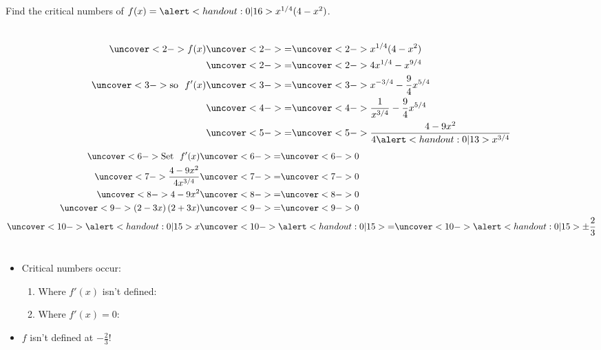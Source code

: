 \begin{frame}
\begin{example}
Find the critical numbers of $f(x) = \alert<handout:0| 16>{x^{1/4}}(4-x^2)$.
\begin{columns}[c]
\abovedisplayskip=0pt
\belowdisplayskip=0pt
\abovedisplayshortskip=0pt
\belowdisplayshortskip=0pt
\begin{align*}
\uncover<2->{%
f(x)%
}%
& \uncover<2->{ = } %
\uncover<2->{%
x^{1/4}(4-x^2)%
}\\%
& \uncover<2->{ = } %
\uncover<2->{%
 4x^{1/4} - x^{9/4}%
}\\%
\uncover<3->{%
\textrm{so}\ \ f'(x) %
}%
& \uncover<3->{ = } %
\uncover<3->{%
x^{-3/4} - \frac{9}{4} x^{5/4}%
}\\%
& \uncover<4->{ = } %
\uncover<4->{%
\frac{1}{x^{3/4}} - \frac{9}{4} x^{5/4}%
}\\%
& \uncover<5->{ = } %
\uncover<5->{%
\frac{4-9 x^2}{4\alert<handout:0| 13>{x^{3/4}}}%
}%
\end{align*}
\abovedisplayskip=0pt
\belowdisplayskip=0pt
\abovedisplayshortskip=0pt
\belowdisplayshortskip=0pt
\begin{align*}
\uncover<6->{\textrm{Set}\ \ f'(x)}%
& \uncover<6->{ = } %
\uncover<6->{0}\\%
\uncover<7->{%
\frac{4-9 x^2}{4x^{3/4}}%
}%
& \uncover<7->{ = } %
\uncover<7->{%
0 %
}\\%
\uncover<8->{%
4-9 x^2%
}%
& \uncover<8->{ = } %
\uncover<8->{%
0 %
}\\%
\uncover<9->{%
\left( 2- 3x\right) \left( 2 + 3 x\right) %
}%
& \uncover<9->{ = } %
\uncover<9->{%
0 %
}\\%
\uncover<10->{%
\alert<handout:0| 15>{x} %
}%
& \uncover<10->{ \alert<handout:0| 15>{=} } %
\uncover<10->{%
\alert<handout:0| 15>{\pm \frac{2}{3}} %
}%
\end{align*}
\end{columns}
\begin{itemize}
\item<11->  Critical numbers occur:
\begin{enumerate}
\item<11-| alert@12-13>  Where $f'(x)$ isn't defined: 
\item<11-| alert@14-15>  Where $f'(x) = 0$: 
\end{enumerate}
\item<16-| alert@16>  $f$ isn't defined at $-\frac{2}{3}$!  
\end{itemize}
\end{example}
\end{frame}

